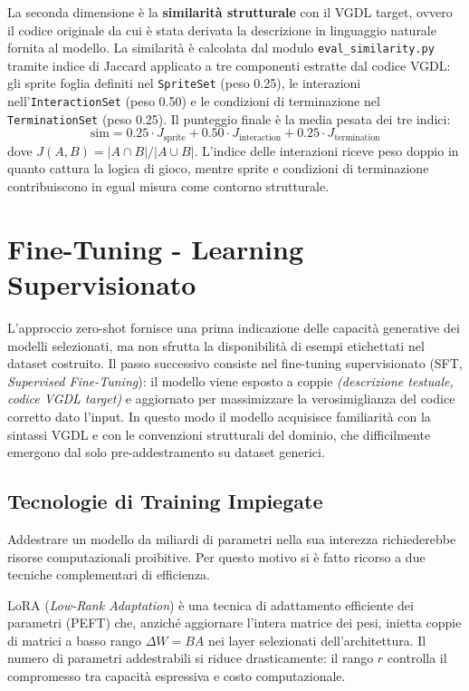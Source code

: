 \documentclass[final,5p,times,twocolumn]{elsarticle}
\begin{document}
La seconda dimensione è la \textbf{similarità strutturale} con il VGDL target, ovvero il codice originale da cui è stata derivata la descrizione in linguaggio naturale fornita al modello. La similarità è calcolata dal modulo \texttt{eval\_similarity.py} tramite indice di Jaccard applicato a tre componenti estratte dal codice VGDL: gli sprite foglia definiti nel \texttt{SpriteSet} (peso 0.25), le interazioni nell'\texttt{InteractionSet} (peso 0.50) e le condizioni di terminazione nel \texttt{TerminationSet} (peso 0.25). Il punteggio finale è la media pesata dei tre indici:
\[
  \text{sim} = 0.25 \cdot J_\text{sprite} + 0.50 \cdot J_\text{interaction} + 0.25 \cdot J_\text{termination}
\]
dove $J(A, B) = |A \cap B| / |A \cup B|$. L'indice delle interazioni riceve peso doppio in quanto cattura la logica di gioco, mentre sprite e condizioni di terminazione contribuiscono in egual misura come contorno strutturale.

\section{Fine-Tuning - Learning Supervisionato}

L'approccio zero-shot fornisce una prima indicazione delle capacità generative dei modelli selezionati, ma non sfrutta la disponibilità di esempi etichettati nel dataset costruito. Il passo successivo consiste nel fine-tuning supervisionato (SFT, \textit{Supervised Fine-Tuning}): il modello viene esposto a coppie \textit{(descrizione testuale, codice VGDL target)} e aggiornato per massimizzare la verosimiglianza del codice corretto dato l'input. In questo modo il modello acquisisce familiarità con la sintassi VGDL e con le convenzioni strutturali del dominio, che difficilmente emergono dal solo pre-addestramento su dataset generici.

\subsection{Tecnologie di Training Impiegate}

Addestrare un modello da miliardi di parametri nella sua interezza richiederebbe risorse computazionali proibitive. Per questo motivo si è fatto ricorso a due tecniche complementari di efficienza.

LoRA (\textit{Low-Rank Adaptation}) è una tecnica di adattamento efficiente dei parametri (PEFT) che, anziché aggiornare l'intera matrice dei pesi, inietta coppie di matrici a basso rango $\Delta W = BA$ nei layer selezionati dell'architettura. Il numero di parametri addestrabili si riduce drasticamente: il rango $r$ controlla il compromesso tra capacità espressiva e costo computazionale.
\end{document}
